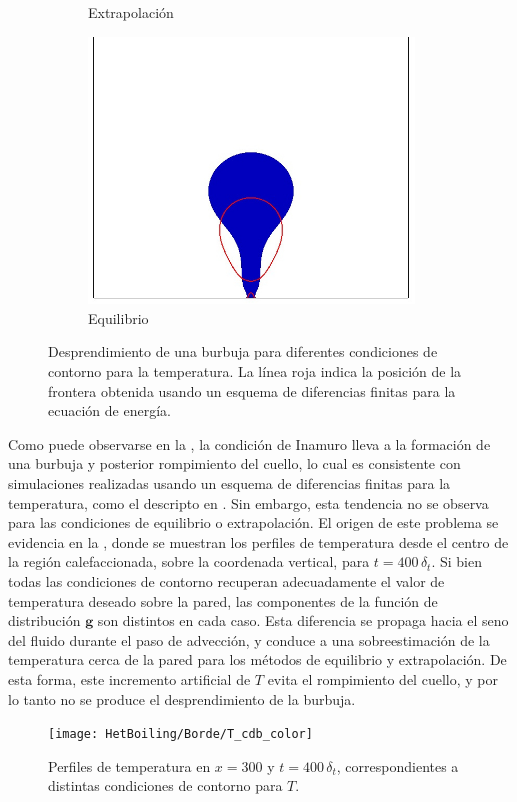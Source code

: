 \begin{figure}[htb]
\begin{subfigure}[t]{0.45\textwidth}
        \caption{Extrapolaci\'on}
    \end{subfigure}
    \begin{subfigure}[t]{0.45\textwidth}
        \centering
        \includegraphics[width=0.95\textwidth]{Imagenes/HetBoiling/Borde/density_equilibrium_fd}
        \caption{Equilibrio}
    \end{subfigure}    
    \caption{Desprendimiento de una burbuja para diferentes condiciones de contorno para la temperatura. La l\'inea roja indica la posici\'on de la frontera obtenida usando un esquema de diferencias finitas para la ecuaci\'on de energ\'ia.}
    \label{fig:bubble2D_bnd}
\end{figure}

Como puede observarse en la , la condici\'on de Inamuro lleva a la formaci\'on de una burbuja y posterior rompimiento del cuello, lo cual es consistente con simulaciones realizadas usando un esquema de diferencias finitas para la temperatura, como el descripto en \cite{li_lattice_2015}. Sin embargo, esta tendencia no se observa para las condiciones de equilibrio o extrapolaci\'on. El origen de este problema se evidencia en la , donde se muestran los perfiles de temperatura desde el centro de la regi\'on calefaccionada, sobre la coordenada vertical, para $t=400\,\delta_t$. Si bien todas las condiciones de contorno recuperan adecuadamente el valor de temperatura deseado sobre la pared, las componentes de la funci\'on de distribuci\'on $\bm{g}$ son distintos en cada caso. Esta diferencia se propaga hacia el seno del fluido durante el paso de advecci\'on, y conduce a una sobreestimaci\'on de la temperatura cerca de la pared para los m\'etodos de equilibrio y extrapolaci\'on. De esta forma, este incremento artificial de $T$ evita el rompimiento del cuello, y por lo tanto no se produce el desprendimiento de la burbuja.
\begin{figure}[ht]
	\centering
	\texttt{[image: HetBoiling/Borde/T\_cdb\_color]}
	\caption{Perfiles de temperatura en $x=300$ y $t=400\,\delta_t$, correspondientes a distintas condiciones de contorno para $T$.}
	\label{fig:hetb_T_cdb}
\end{figure}


